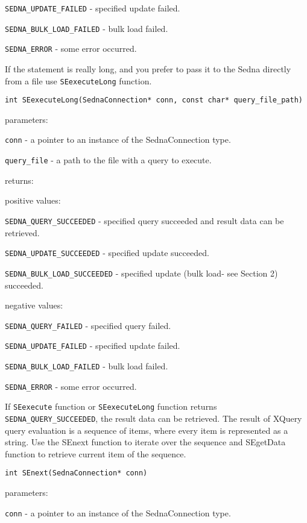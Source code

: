 \documentclass[a4paper,12pt]{article}
\begin{document}
\verb!SEDNA_UPDATE_FAILED! - specified update failed.

\verb!SEDNA_BULK_LOAD_FAILED! - bulk load failed.

\verb!SEDNA_ERROR! - some error occurred.



If the statement is really long, and you prefer to pass it to the Sedna directly from a file use \verb!SEexecuteLong! function.

\begin{verbatim}int SEexecuteLong(SednaConnection* conn, const char* query_file_path)\end{verbatim}

parameters:

\verb!conn! - a pointer to an instance of the SednaConnection type.

\verb!query_file! - a path to the file with a query to execute.

returns:

positive values:

\verb!SEDNA_QUERY_SUCCEEDED! - specified query succeeded and result data can be retrieved.

\verb!SEDNA_UPDATE_SUCCEEDED! - specified update succeeded.

\verb!SEDNA_BULK_LOAD_SUCCEEDED! - specified update (bulk load- see Section 2) succeeded.


negative values:

\verb!SEDNA_QUERY_FAILED! - specified query failed.

\verb!SEDNA_UPDATE_FAILED! - specified update failed.

\verb!SEDNA_BULK_LOAD_FAILED! - bulk load failed.

\verb!SEDNA_ERROR! - some error occurred.


If \verb!SEexecute! function or \verb!SEexecuteLong! function returns \verb!SEDNA_QUERY_SUCCEEDED!, the result data can be retrieved. The result of XQuery query evaluation is a sequence of items, where every item is represented as
a string. Use the SEnext function to iterate over the sequence and SEgetData function to retrieve current item of the sequence.

\begin{verbatim}int SEnext(SednaConnection* conn)\end{verbatim}

parameters:

\verb!conn! - a pointer to an instance of the SednaConnection type.
\end{document}
